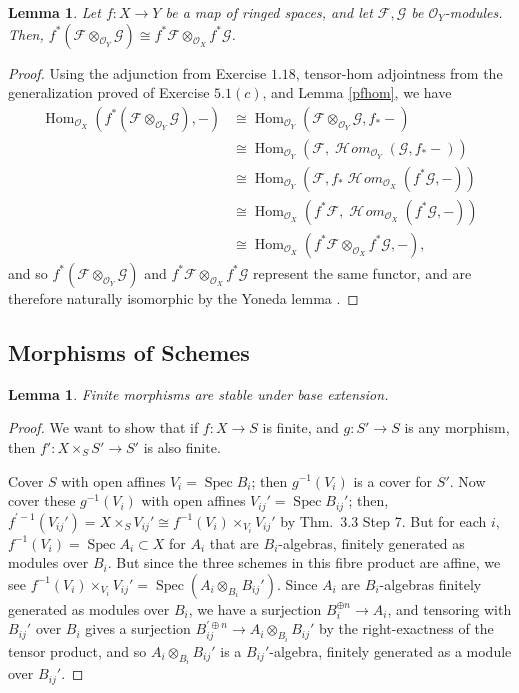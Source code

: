 \documentclass[10pt]{article}
\newtheorem{lemma}[subsubsection]{Lemma}
\theoremstyle{definition}
\theoremstyle{remark}
\numberwithin{equation}{section}
\numberwithin{figure}{subsubsection}
\DeclareMathOperator{\Spec}{Spec}
\DeclareMathOperator{\Hom}{Hom}
\newcommand{\FF}{\mathscr{F}}
\newcommand{\GG}{\mathscr{G}}
\newcommand{\OO}{\mathcal{O}}
\DeclareMathOperator{\HHom}{\mathscr{H}\!\mathit{om}}
\begin{document}
\begin{lemma}\label{tpinvimg}
  Let $f\colon X \to Y$ be a map of ringed spaces, and let $\FF,\GG$ be $\OO_Y$-modules. Then, $f^*(\FF \otimes_{\OO_Y} \GG) \cong f^*\FF \otimes_{\OO_X} f^*\GG$.
\end{lemma}
\begin{proof}
  Using the adjunction from Exercise $1.18$, tensor-hom adjointness from the
  generalization proved of Exercise $5.1(c)$, and Lemma \ref{pfhom}, we have
  \begin{align*}
    \Hom_{\OO_X}(f^*(\FF \otimes_{\OO_Y} \GG),-) &\cong \Hom_{\OO_Y}(\FF \otimes_{\OO_Y} \GG,f_*-)\\
    &\cong \Hom_{\OO_Y}(\FF,\HHom_{\OO_Y}(\GG,f_*-))\\
    &\cong \Hom_{\OO_Y}(\FF,f_*\HHom_{\OO_X}(f^*\GG,-))\\
    &\cong \Hom_{\OO_X}(f^*\FF,\HHom_{\OO_X}(f^*\GG,-))\\
    &\cong \Hom_{\OO_X}(f^*\FF \otimes_{\OO_X} f^*\GG,-),
  \end{align*}
  and so $f^*(\FF \otimes_{\OO_Y} \GG)$ and $f^*\FF \otimes_{\OO_X} f^*\GG$ represent the same functor, and are therefore naturally isomorphic by the Yoneda lemma \cite[p.~61]{Mac98}.
\end{proof}
\subsection{Morphisms of Schemes}
\begin{lemma}\label{lem:finitebasechange}
  Finite morphisms are stable under base extension.
\end{lemma}
\begin{proof}
  We want to show that if $f\colon X \to S$ is finite, and $g\colon S' \to S$ is any morphism, then $f'\colon X \times_S S' \to S'$ is also finite.
  \par Cover $S$ with open affines $V_i = \Spec B_i$; then $g^{-1}(V_i)$ is a
  cover for $S'$. Now cover these $g^{-1}(V_i)$ with open affines $V_{ij}' =
  \Spec B_{ij}'$; then, $f^{\prime-1}(V_{ij}') = X \times_S V_{ij}' \cong f^{-1}(V_i)
  \times_{V_i} V_{ij}'$ by Thm.~3.3 Step 7. But for each $i$, $f^{-1}(V_i) =
  \Spec A_i \subset X$ for $A_{i}$ that are $B_i$-algebras, finitely
  generated as modules over $B_i$. But since the three
  schemes in this fibre product are affine, we see $f^{-1}(V_i) \times_{V_i}
  V_{ij}' = \Spec (A_i \otimes_{B_i} B_{ij}')$. Since $A_i$ are $B_i$-algebras
  finitely generated as modules over $B_i$, we have a surjection $B_i^{\oplus n} \to
  A_{i}$, and tensoring with $B_{ij}'$ over $B_i$ gives a surjection
  $B_{ij}^{\prime\oplus n} \to A_{i} \otimes_{B_i} B_{ij}'$ by the right-exactness of
  the tensor product, and so $A_{i} \otimes_{B_i} B_{ij}'$ is a
  $B_{ij}'$-algebra, finitely generated as a module over $B_{ij}'$.
\end{proof}
\end{document}
